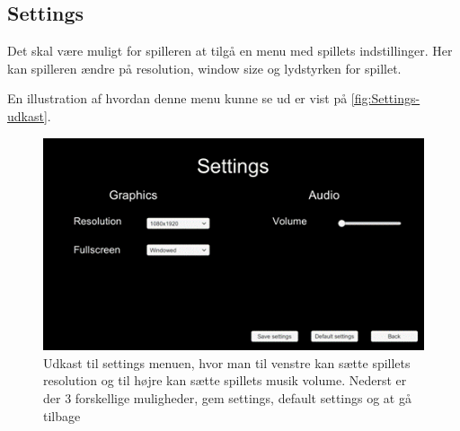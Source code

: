 \subsection{Settings}
Det skal være muligt for spilleren at tilgå en menu med spillets indstillinger. Her kan spilleren ændre på resolution, window size og lydstyrken for spillet.

En illustration af hvordan denne menu kunne se ud er vist på \autoref{fig:Settings-udkast}.

\begin{figure}[H]
\centering
\includegraphics[width = \textwidth]{02-Body/Images/SettingsMenu-udkast.png}
\caption{Udkast til settings menuen, hvor man til venstre kan sætte spillets resolution og til højre kan sætte spillets musik volume.
Nederst er der 3 forskellige muligheder, gem settings, default settings og at gå tilbage}
\label{fig:Settings-udkast}
\end{figure}
